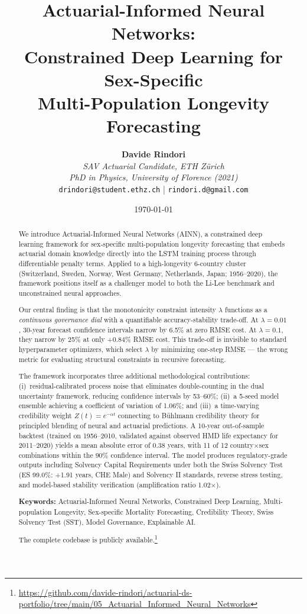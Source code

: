 \documentclass[11pt,a4paper]{article}
\title{\textbf{Actuarial-Informed Neural Networks: \\ Constrained Deep Learning for Sex-Specific \\ Multi-Population Longevity Forecasting}}
\author{
    \textbf{Davide Rindori} \\
    \textit{SAV Actuarial Candidate, ETH Z\"urich} \\
    \textit{PhD in Physics, University of Florence (2021)} \\
    \texttt{drindori@student.ethz.ch} \quad | \quad \texttt{rindori.d@gmail.com}
}
\date{\today}
\begin{document}
\maketitle

\begin{abstract}
We introduce Actuarial-Informed Neural Networks (AINN), a constrained deep learning framework for sex-specific multi-population longevity forecasting that embeds actuarial domain knowledge directly into the LSTM training process through differentiable penalty terms. Applied to a high-longevity 6-country cluster (Switzerland, Sweden, Norway, West Germany, Netherlands, Japan; 1956--2020), the framework positions itself as a challenger model to both the Li-Lee benchmark and unconstrained neural approaches.

Our central finding is that the monotonicity constraint intensity $\lambda$ functions as a \textit{continuous governance dial} with a quantifiable accuracy-stability trade-off. At $\lambda = 0.01$, 30-year forecast confidence intervals narrow by 6.5\% at zero RMSE cost. At $\lambda = 0.1$, they narrow by 25\% at only +0.84\% RMSE cost. This trade-off is invisible to standard hyperparameter optimizers, which select $\lambda$ by minimizing one-step RMSE --- the wrong metric for evaluating structural constraints in recursive forecasting.

The framework incorporates three additional methodological contributions: (i)~residual-calibrated process noise that eliminates double-counting in the dual uncertainty framework, reducing confidence intervals by 53--60\%; (ii)~a 5-seed model ensemble achieving a coefficient of variation of 1.06\%; and (iii)~a time-varying credibility weight $Z(t) = e^{-\alpha t}$ connecting to B\"uhlmann credibility theory for principled blending of neural and actuarial predictions. A 10-year out-of-sample backtest (trained on 1956--2010, validated against observed HMD life expectancy for 2011--2020) yields a mean absolute error of 0.38 years, with 11 of 12 country$\times$sex combinations within the 90\% confidence interval. The model produces regulatory-grade outputs including Solvency Capital Requirements under both the Swiss Solvency Test (ES 99.0\%: +1.91 years, CHE Male) and Solvency II standards, reverse stress testing, and model-based stability verification (amplification ratio 1.02$\times$).

\vspace{0.4cm}
\noindent \textbf{Keywords:} Actuarial-Informed Neural Networks, Constrained Deep Learning, Multi-population Longevity, Sex-specific Mortality Forecasting, Credibility Theory, Swiss Solvency Test (SST), Model Governance, Explainable AI.

\vspace{0.2cm}
\noindent The complete codebase is publicly available.\footnote{\url{https://github.com/davide-rindori/actuarial-ds-portfolio/tree/main/05_Actuarial_Informed_Neural_Networks}}
\end{abstract}
\end{document}
